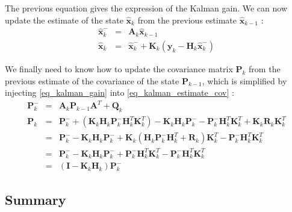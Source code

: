 \documentclass[10pt,oneside]{scrartcl}
\newcommand\vecteur[1]{\boldsymbol#1}
\newcommand\matrice[1]{\mathbf#1}
\begin{document}
The previous equation gives the expression of the Kalman gain. We can now update the estimate of the state $\hat{\vecteur{x}}_k$ from the previous estimate $\hat{\vecteur{x}}_{k-1}$ :
\begin{eqnarray}
\hat{\vecteur{x}}_k^- &=& \matrice{A}_k \hat{\vecteur{x}}_{k-1}\\
\hat{\vecteur{x}}_k &=& \hat{\vecteur{x}}_k^- + \matrice{K_k} (\vecteur{y_k} - \matrice{H}_k \hat{\vecteur{x}}_k^-)
\end{eqnarray}

We finally need to know how to update the covariance matrix $\matrice{P_k}$ from the previous estimate of the covariance of the state $\matrice{P_{k-1}}$, which is simplified by injecting \ref{eq_kalman_gain} into \ref{eq_kalman_estimate_cov} :
\begin{eqnarray}
\matrice{P^-_k} &=& \matrice{A}_k \matrice{P_{k-1}} \matrice{A}^T + \matrice{Q_k}\\
\matrice{P_k} &=& \matrice{P^-_k} + (\matrice{K_k} \matrice{H}_k \matrice{P^-_k} \matrice{H}_k^T \matrice{K_k}^T) - \matrice{K_k} \matrice{H}_k \matrice{P^-_k} - \matrice{P^-_k} \matrice{H}_k^T \matrice{K_k}^T +  \matrice{K_k} \matrice{R_k} \matrice{K_k}^T\\
              &=& \matrice{P^-_k} - \matrice{K_k} \matrice{H}_k \matrice{P^-_k} + \matrice{K_k}(\matrice{H}_k \matrice{P^-_k} \matrice{H}_k^T + \matrice{R_k}) \matrice{K_k}^T - \matrice{P^-_k} \matrice{H}_k^T \matrice{K_k}^T\\
              &=& \matrice{P^-_k} - \matrice{K_k} \matrice{H}_k \matrice{P^-_k} + \matrice{P^-_k} \matrice{H}_k^T \matrice{K_k}^T - \matrice{P^-_k} \matrice{H}_k^T \matrice{K_k}^T\\
              &=& (\matrice{I} - \matrice{K_k} \matrice{H}_k) \matrice{P^-_k}
\end{eqnarray}

\subsection{Summary}
\end{document}
